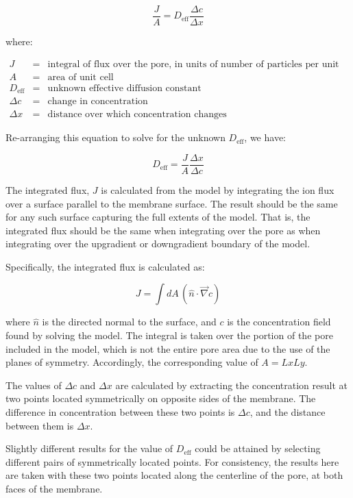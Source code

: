 \documentclass{article}
\begin{document}
$$\frac{J}{A} = D_{\text{eff}} \frac{\Delta c}{\Delta x}$$

where:

$\begin{array}{rcl}
J & = & \text{integral of flux over the pore, in units of number of particles per unit time} \\
A & = & \text{area of unit cell} \\
D_{\text{eff}} & = & \text{unknown effective diffusion constant} \\
\Delta c & = & \text{change in concentration} \\
\Delta x & = & \text{distance over which concentration changes}
\end{array}$

Re-arranging this equation to solve for the unknown $D_{\text{eff}}$, we have:

$$D_{\text{eff}} = \frac{J}{A} \frac{\Delta x}{\Delta c}$$

The integrated flux, $J$ is calculated from the model by integrating
the ion flux over a surface parallel to the membrane surface.
The result should be the same for any such surface capturing the full extents of the model.
That is, the integrated flux should be the same when integrating over the pore as
when integrating over the upgradient or downgradient boundary of the model.

Specifically, the integrated flux is calculated as:

$$J = \int dA\, \left(\hat{n} \cdot \vec{\nabla} c \right)$$

where $\hat{n}$ is the directed normal to the surface,
and $c$ is the concentration field found by solving the model.
The integral is taken over the portion of the pore included in the model,
which is not the entire pore area due to the use of the planes of symmetry.
Accordingly, the corresponding value of $A = Lx Ly$.

The values of $\Delta c$ and $\Delta x$ are calculated by extracting
the concentration result at two points located symmetrically on opposite sides of the membrane.
The difference in concentration between these two points is $\Delta c$,
and the distance between them is $\Delta x$.

Slightly different results for the value of $D_{\text{eff}}$ could be attained by selecting different
pairs of symmetrically located points.
For consistency, the results here are taken with these two points located
along the centerline of the pore, at both faces of the membrane.
\end{document}
